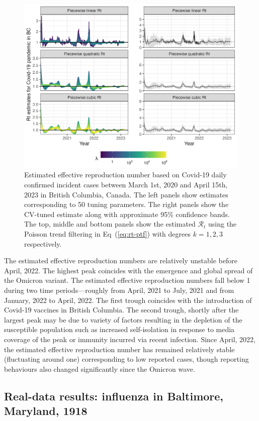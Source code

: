 \documentclass[10pt,letterpaper]{article}
\def\calR{\mathcal{R}}
\renewcommand{\eqref}[1]{Eq~(\ref{#1})}
\begin{document}
\begin{figure}[!ht]
  \centering
  \includegraphics[width=0.9\linewidth]{fig/covid_full_res.png}
  \caption{Estimated effective reproduction number based on Covid-19 daily
  confirmed incident cases between March 1st, 2020 and April 15th, 2023 in
  British Columbia, Canada. The left panels show estimates corresponding to 50
  tuning parameters. The right panels show the CV-tuned estimate along with
  approximate 95\% confidence bands. The top, middle and bottom panels show the
  estimated $\calR_t$ using the Poisson trend filtering in \eqref{eq:rt-ptf}
  with degrees $k=1,2,3$ respectively.} 
  \label{fig:covid-rt}
\end{figure} 

The estimated effective reproduction numbers are relatively unstable before April,
2022. The highest peak coincides with the emergence and global spread of the
Omicron variant. The estimated effective reproduction numbers fall below 1 during two time
periods---roughly from April, 2021 to July, 2021 and from January,
2022 to April, 2022. The first trough coincides with the introduction of
Covid-19 vaccines in British Columbia. The second trough, shortly after the
largest peak may be due to variety of factors resulting in the depletion of the
susceptible population such as increased self-isolation in response to media
coverage of the peak or immunity incurred via recent infection. Since April,
2022, the estimated effective reproduction number has remained relatively stable
(fluctuating around one) corresponding to low reported cases, though reporting
behaviours also changed significantly since the Omicron wave. 


\subsection{Real-data results: influenza in Baltimore, Maryland, 1918}
\end{document}
